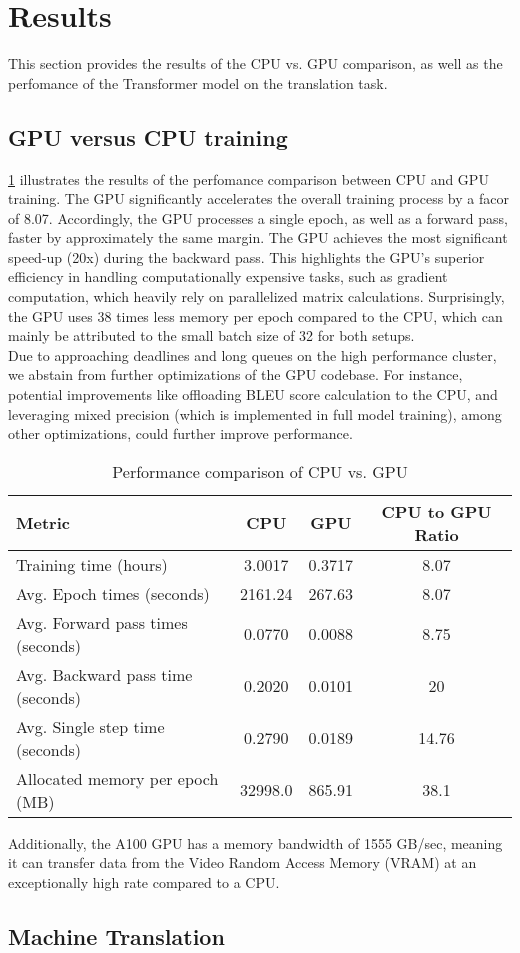 \section{Results}\label{sec:results}

This section provides the results of the CPU vs. GPU comparison, as well as the perfomance of the Transformer model on the translation task.

\subsection{GPU versus CPU training}

\cref{tab:comparison} illustrates the results of the perfomance comparison between CPU and GPU training.
The GPU significantly accelerates the overall training process by a facor of 8.07.
Accordingly, the GPU processes a single epoch, as well as a forward pass, faster by approximately the same margin.
The GPU achieves the most significant speed-up (20x) during the backward pass.
This highlights the GPU's superior efficiency in handling computationally expensive tasks, such as gradient computation, which heavily rely on parallelized matrix calculations.
Surprisingly, the GPU uses 38 times less memory per epoch compared to the CPU, which can mainly be attributed to the small batch size of 32 for both setups. \\
Due to approaching deadlines and long queues on the high performance cluster, we abstain from further optimizations of the GPU codebase.
For instance, potential improvements like offloading BLEU score calculation to the CPU, and leveraging mixed precision (which is implemented in full model training), among other optimizations, could further improve performance. 



\begin{table}[ht]
    \centering
    \begin{tabular}{lccc}
        \toprule
        \textbf{Metric} & \textbf{CPU} & \textbf{GPU} & \textbf{CPU to GPU Ratio} \\
        \midrule
        Training time (hours)       & 3.0017 & 0.3717 & 8.07 \\
        Avg. Epoch times (seconds)       & 2161.24 & 267.63 & 8.07 \\
        Avg. Forward pass times (seconds)& 0.0770 & 0.0088 & 8.75 \\
        Avg. Backward pass time (seconds)& 0.2020 & 0.0101 & 20 \\
        Avg. Single step time (seconds)  & 0.2790 & 0.0189 & 14.76  \\
        Allocated memory per epoch (MB)       & 32998.0  & 865.91 & 38.1 \\
        \bottomrule
    \end{tabular}
    \caption{Performance comparison of CPU vs. GPU}
    \label{tab:comparison}
\end{table}
Additionally, the A100 GPU has a memory bandwidth of 1555 GB/sec, meaning it can transfer data from the Video Random Access Memory (VRAM) at an exceptionally high rate compared to a CPU.

\subsection{Machine Translation}
